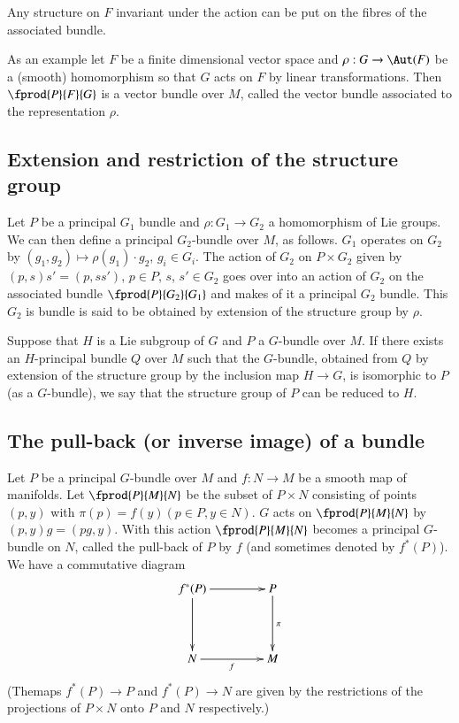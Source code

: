 Any structure on $F$ invariant under the action can be put on the fibres of the associated bundle.

As an example let $F$ be a finite dimensional vector space and $\rho:G\to \Aut(F)$ be a (smooth) homomorphism so that $G$ acts on $F$ by linear transformations. Then $\fprod{P}{F}{G}$ is a vector bundle over $M$, called the vector bundle associated to the representation $\rho$. 

\subsection*{Extension and restriction of the structure group}
\pageoriginale

Let $P$ be a principal $G_{1}$ bundle and $\rho:G_{1}\to G_{2}$ a homomorphism of Lie groups. We can then define a principal $G_{2}$-bundle over $M$, as follows. $G_{1}$ operates on $G_{2}$ by $(g_{1},g_{2})\mapsto \rho(g_{1})\cdot g_{2}$, $g_{i}\in G_{i}$. The action of $G_{2}$ on $P\times G_{2}$ given by $(p,s)s'=(p,ss')$, $p\in P$, $s$, $s'\in G_{2}$ goes over into an action of $G_{2}$ on the associated bundle $\fprod{P}{G_{2}}{G_{1}}$ and makes of it a principal $G_{2}$ bundle. This $G_{2}$ is bundle is said to be obtained by extension of the structure group by $\rho$.

Suppose that $H$ is a Lie subgroup of $G$ and $P$ a $G$-bundle over $M$. If there exists an $H$-principal bundle $Q$ over $M$ such that the $G$-bundle, obtained from $Q$ by extension of the structure group by the inclusion map $H\to G$, is isomorphic to $P$ (as a $G$-bundle), we say that the structure group of $P$ can be reduced to $H$.

\subsection*{The pull-back (or inverse image) of a bundle}

Let $P$ be a principal $G$-bundle over $M$ and $f:N\to M$ be a smooth map of manifolds. Let $\fprod{P}{M}{N}$ be the subset of $P\times N$ consisting of points $(p,y)$ with $\pi(p)=f(y)(p\in P,y\in N)$. $G$ acts on $\fprod{P}{M}{N}$ by $(p,y)g=(pg,y)$. With this action $\fprod{P}{M}{N}$ becomes a principal $G$-bundle on $N$, called the pull-back of $P$ by $f$ (and sometimes denoted by $f^{*}(P)$). We have a commutative diagram
\[
\xymatrix@=1.5cm{
f^{*}(P)\ar[r]\ar[d] & P\ar[d]^{\pi}\\
N\ar[r]_-{f} & M
}
\]
(The\pageoriginale maps $f^{*}(P)\to P$ and $f^{*}(P)\to N$ are given by the restrictions of the projections of $P\times N$ onto $P$ and $N$ respectively.)

